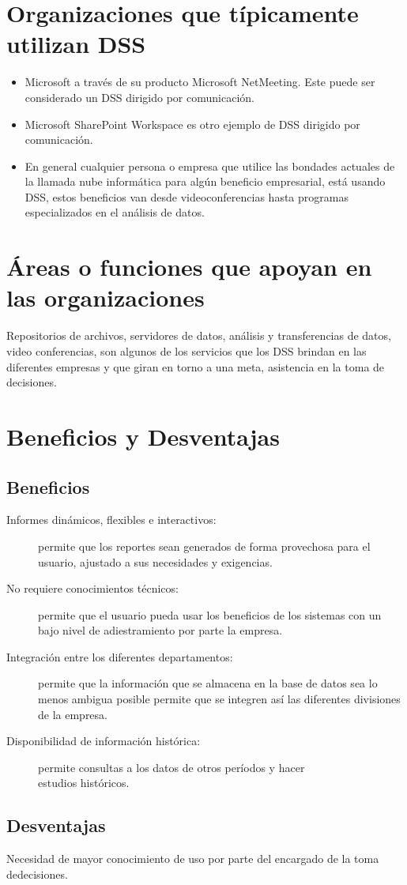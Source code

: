 \section {Organizaciones que típicamente utilizan DSS}
\begin{itemize}
\item Microsoft a través de su producto Microsoft NetMeeting. Este puede ser considerado un DSS dirigido por comunicación.
\item Microsoft SharePoint Workspace es otro ejemplo de DSS dirigido por comunicación.
\item En general cualquier persona o empresa que utilice las bondades actuales  de la llamada nube informática para algún beneficio empresarial, está  usando DSS, estos beneficios van desde videoconferencias hasta programas especializados en el análisis de datos.
\end{itemize}

\section {Áreas o funciones que apoyan en las organizaciones}
Repositorios de archivos, servidores de datos, análisis y transferencias de datos, video conferencias, son algunos de los servicios que los DSS brindan en las diferentes empresas y que giran en torno a una meta, asistencia en la toma de decisiones.

\section {Beneficios y Desventajas}

\subsection{Beneficios}
\begin{description}
\item [Informes dinámicos, flexibles e interactivos:] permite que los reportes sean generados de forma provechosa para el usuario, ajustado a sus necesidades y exigencias.
\item [No requiere conocimientos técnicos:] permite que el usuario pueda usar los beneficios de los sistemas con un bajo nivel de adiestramiento por parte la empresa.
\item [Integración entre los diferentes departamentos:] permite que la información que se almacena en la base de datos sea lo menos ambigua posible permite que se integren así las diferentes divisiones de la empresa.
\item [Disponibilidad de información histórica:] permite consultas a los datos de otros períodos y hacer\\ estudios históricos.
\end{description}

\subsection{Desventajas}
\begin{description}
\item Necesidad de mayor conocimiento de uso por parte del encargado de la toma dedecisiones.
\end{description}


